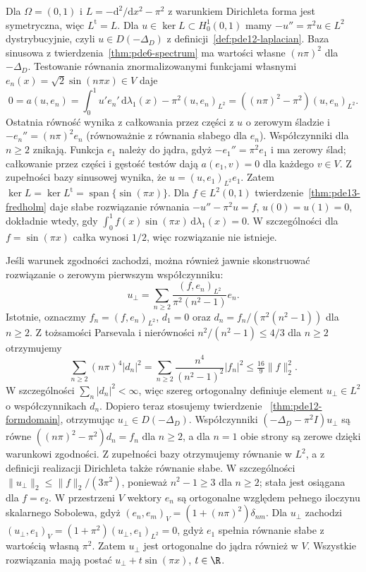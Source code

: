 \begin{przyklad}
\label{ex:pde13-resonance}
Dla $\Omega=(0,1)$ i $L=-\mathrm d^2/\mathrm dx^2-\pi^2$
z warunkiem Dirichleta forma jest symetryczna, więc
$L^{\mathrm t}=L$. Dla $u\in\ker L\subset H_0^1(0,1)$
mamy $-u''=\pi^2u\in L^2$ dystrybucyjnie, czyli
$u\in D(-\Delta_D)$ z definicji~\ref{def:pde12-laplacian}.
Baza sinusowa z twierdzenia~\ref{thm:pde6-spectrum}
ma wartości własne $(n\pi)^2$ dla $-\Delta_D$.
Testowanie równania znormalizowanymi funkcjami własnymi
$e_n(x)=\sqrt2\sin(n\pi x)\in V$ daje
\[
 0=a(u,e_n)
 =\int_0^1 u'e_n'\,\mathrm d\lambda_1(x)
 -\pi^2(u,e_n)_{L^2}
 =((n\pi)^2-\pi^2)(u,e_n)_{L^2}.
\]
Ostatnia równość wynika z całkowania przez części
z $u$ o zerowym śladzie i $-e_n''=(n\pi)^2e_n$
(równoważnie z równania słabego dla $e_n$).
Współczynniki dla $n\ge2$ znikają. Funkcja $e_1$ należy
do jądra, gdyż $-e_1''=\pi^2e_1$ i ma zerowy ślad;
całkowanie przez części i gęstość testów dają
$a(e_1,v)=0$ dla każdego $v\in V$. Z zupełności bazy
sinusowej wynika, że $u=(u,e_1)_{L^2}e_1$.
Zatem
$\ker L=\ker L^{\mathrm t}=\operatorname{span}\{\sin(\pi x)\}$.
Dla $f\in L^2(0,1)$ twierdzenie~\ref{thm:pde13-fredholm}
daje słabe rozwiązanie równania $-u''-\pi^2u=f$,
$u(0)=u(1)=0$, dokładnie wtedy, gdy
$\int_0^1 f(x)\sin(\pi x)\,\mathrm d\lambda_1(x)=0$.
W szczególności dla $f=\sin(\pi x)$ całka wynosi $1/2$,
więc rozwiązanie nie istnieje.

Jeśli warunek zgodności zachodzi, można również jawnie
skonstruować rozwiązanie o zerowym pierwszym współczynniku:
\[
 u_\perp=\sum_{n\ge2}\frac{(f,e_n)_{L^2}}{\pi^2(n^2-1)}e_n.
\]
Istotnie, oznaczmy $f_n=(f,e_n)_{L^2}$, $d_1=0$ oraz
$d_n=f_n/(\pi^2(n^2-1))$ dla $n\ge2$.
Z tożsamości Parsevala i nierówności
$n^2/(n^2-1)\le4/3$ dla $n\ge2$ otrzymujemy
\[
 \sum_{n\ge2}(n\pi)^4|d_n|^2
 =\sum_{n\ge2}\frac{n^4}{(n^2-1)^2}|f_n|^2
 \le\tfrac{16}{9}\|f\|_2^2.
\]
W szczególności $\sum_n|d_n|^2<\infty$, więc szereg
ortogonalny definiuje element $u_\perp\in L^2$ o
współczynnikach $d_n$. Dopiero teraz stosujemy twierdzenie
~\ref{thm:pde12-formdomain}, otrzymując
$u_\perp\in D(-\Delta_D)$.
Współczynniki $(-\Delta_D-\pi^2 I)u_\perp$ są równe
$((n\pi)^2-\pi^2)d_n=f_n$ dla $n\ge2$, a dla $n=1$
obie strony są zerowe dzięki warunkowi zgodności.
Z zupełności bazy otrzymujemy równanie w $L^2$,
a z definicji realizacji Dirichleta także równanie słabe.
W szczególności $\|u_\perp\|_2\le\|f\|_2/(3\pi^2)$,
ponieważ $n^2-1\ge3$ dla $n\ge2$; stała jest osiągana
dla $f=e_2$.
W przestrzeni $V$ wektory $e_n$ są ortogonalne względem
pełnego iloczynu skalarnego Sobolewa, gdyż
$(e_n,e_m)_V=(1+(n\pi)^2)\delta_{nm}$.
Dla $u_\perp$ zachodzi
$(u_\perp,e_1)_V=(1+\pi^2)(u_\perp,e_1)_{L^2}=0$,
gdyż $e_1$ spełnia równanie słabe z wartością własną $\pi^2$.
Zatem $u_\perp$ jest ortogonalne do jądra również w $V$.
Wszystkie rozwiązania mają postać
$u_\perp+t\sin(\pi x)$, $t\in\R$.
\end{przyklad}

